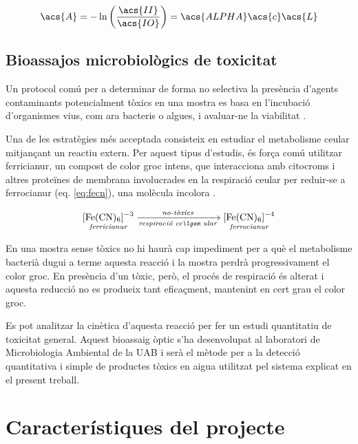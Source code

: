 \begin{equation}
\acs{A} = -\ln\left(\frac{\acs{II}}{\acs{IO}}\right) = \acs{ALPHA}\acs{c}\acs{L}
\end{equation}

\subsection{Bioassajos microbiològics de toxicitat}\label{subsec:bioassajos_microbiològics_de_toxicitat}

Un protocol comú per a determinar de forma no selectiva la presència d'agents contaminants potencialment tòxics en una mostra es basa en l'incubació d'organismes vius, com ara bacteris o algues, i avaluar-ne la viabilitat \cite{oanh:1995,tizzard:2004}. 

Una de les estratègies més acceptada consisteix en estudiar el metabolisme ce\lgem ular mitjançant un reactiu extern. Per aquest tipus d'estudis, és força comú utilitzar ferricianur, un compost de color groc intens, que interacciona amb citocroms i altres proteïnes de membrana involucrades en la respiració ce\lgem ular per reduir-se a ferrocianur (eq. \ref{eq:fecn}), una molècula incolora \cite{morris:2001,liu:2009,catterall:2010,li:2013,yip:2014}.

\begin{equation}\label{eq:fecn}
	\ce{\underset{\textit{ferricianur}}{\ce{[Fe(CN)_{6}]^{-3}}} ->[\textit{no-tòxics}][\textit{respiració ce\lgem ular}] \underset{\textit{ferrocianur}}{\ce{[Fe(CN)_{6}]^{-4}}}}
\end{equation}

En una mostra sense tòxics no hi haurà cap impediment per a què el metabolisme bacterià dugui a terme aquesta reacció i la mostra perdrà progressivament el color groc. En presència d'un tòxic, però, el procés de respiració és alterat i aquesta reducció no es produeix tant eficaçment, mantenint en cert grau el color groc.

Es pot analitzar la cinètica d'aquesta reacció per fer un estudi quantitatiu de toxicitat general. Aquest bioassaig òptic s'ha desenvolupat al laboratori de Microbiologia Ambiental de la \ac{UAB} i serà el mètode per a la detecció quantitativa i simple de productes tòxics en aigua utilitzat pel sistema explicat en el present treball.

\section{Característiques del projecte}

